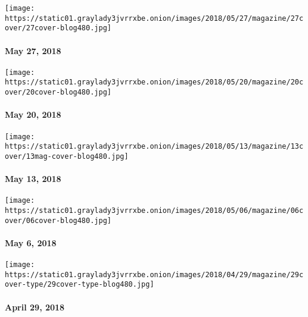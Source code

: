 \href{https://www.nytimes3xbfgragh.onion/issue/magazine/2018/05/25/052718-issue}{}

\texttt{[image: https://static01.graylady3jvrrxbe.onion/images/2018/05/27/magazine/27cover/27cover-blog480.jpg]}

\hypertarget{may-27-2018}{%
\paragraph{May 27, 2018}\label{may-27-2018}}

\href{https://www.nytimes3xbfgragh.onion/issue/magazine/2018/05/25/052018-issue}{}

\texttt{[image: https://static01.graylady3jvrrxbe.onion/images/2018/05/20/magazine/20cover/20cover-blog480.jpg]}

\hypertarget{may-20-2018}{%
\paragraph{May 20, 2018}\label{may-20-2018}}

\href{https://www.nytimes3xbfgragh.onion/issue/magazine/2018/05/25/51318-issue}{}

\texttt{[image: https://static01.graylady3jvrrxbe.onion/images/2018/05/13/magazine/13cover/13mag-cover-blog480.jpg]}

\hypertarget{may-13-2018}{%
\paragraph{May 13, 2018}\label{may-13-2018}}

\href{https://www.nytimes3xbfgragh.onion/issue/magazine/2018/05/11/5618-issue}{}

\texttt{[image: https://static01.graylady3jvrrxbe.onion/images/2018/05/06/magazine/06cover/06cover-blog480.jpg]}

\hypertarget{may-6-2018}{%
\paragraph{May 6, 2018}\label{may-6-2018}}

\href{https://www.nytimes3xbfgragh.onion/issue/magazine/2018/05/04/42918-issue}{}

\texttt{[image: https://static01.graylady3jvrrxbe.onion/images/2018/04/29/magazine/29cover-type/29cover-type-blog480.jpg]}

\hypertarget{april-29-2018}{%
\paragraph{April 29, 2018}\label{april-29-2018}}

